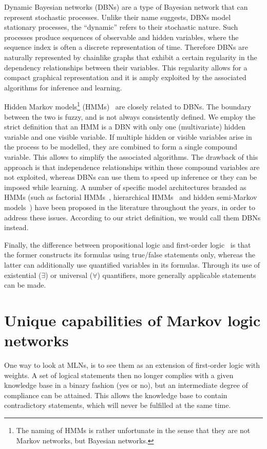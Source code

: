 \documentclass[letterpaper]{article} %
\begin{document}
Dynamic Bayesian networks (DBNs) are a type of Bayesian network that can represent stochastic processes. Unlike their name suggests, DBNs model stationary processes, the ``dynamic'' refers to their stochastic nature. Such processes produce sequences of observable and hidden variables, where the sequence index is often a discrete representation of time. Therefore DBNs are naturally represented by chainlike graphs that exhibit a certain regularity in the dependency relationships between their variables. This regularity allows for a compact graphical representation and it is amply exploited by the associated algorithms for inference and learning.

Hidden Markov models\footnote{The naming of HMMs is rather unfortunate in the sense that they are not Markov networks, but Bayesian networks.} (HMMs)~\cite{ghahramani2001ijprai} are closely related to DBNs. The boundary between the two is fuzzy, and is not always consistently defined. We employ the strict definition that an HMM is a DBN with only one (multivariate) hidden variable and one visible variable. If multiple hidden or visible variables arise in the process to be modelled, they are combined to form a single compound variable. This allows to simplify the associated algorithms. The drawback of this approach is that independence relationships within these compound variables are not exploited, whereas DBNs can use them to speed up inference or they can be imposed while learning. A number of specific model architectures branded as HMMs (such as factorial HMMs~\cite{jordan1996nips}, hierarchical HMMs~\cite{fine1998ml} and hidden semi-Markov models~\cite{yu2010ai})
have been proposed in the literature throughout the years, in order to address these issues. According to our strict definition, we would call them DBNs instead.

Finally, the difference between propositional logic and first-order logic~\cite{russell2009aiama} is that the former constructs its formulas using true/false statements only, whereas the latter can additionally use quantified variables in its formulas. Through its use of existential ($\exists$) or universal ($\forall$) quantifiers, more generally applicable statements can be made.

\section{Unique capabilities of Markov logic networks}
One way to look at MLNs, is to see them as an extension of first-order logic with weights. A set of logical statements then no longer complies with a given knowledge base in a binary fashion (yes or no), but an intermediate degree of compliance can be attained. This allows the knowledge base to contain contradictory statements, which will never be fulfilled at the same time.
\end{document}
